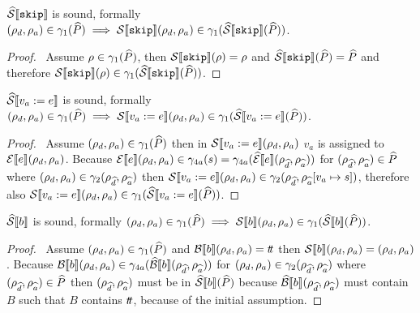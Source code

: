 \begin{conjecture}\label{thm:sound-skip}
    $\widehat{\mathcal{S}} \llbracket \texttt{skip} \rrbracket$ is sound, formally $(\rho_d, \rho_a) \in \gamma_1(\widehat{P}) \implies \mathcal{S} \llbracket \texttt{skip} \rrbracket(\rho_d, \rho_a) \in \gamma_1(\widehat{\mathcal{S}} \llbracket \texttt{skip} \rrbracket(\widehat{P}))$.
\end{conjecture}
\begin{proof}
    \pf\ Assume $\rho \in \gamma_1(\widehat{P})$, then $\mathcal{S} \llbracket \texttt{skip} \rrbracket(\rho) = \rho$ and $\widehat{\mathcal{S}} \llbracket \texttt{skip} \rrbracket(\widehat{P}) = \widehat{P}$ and therefore $\mathcal{S} \llbracket \texttt{skip} \rrbracket(\rho) \in \gamma_1(\widehat{\mathcal{S}} \llbracket \texttt{skip} \rrbracket(\widehat{P}))$.
\end{proof}

\begin{conjecture}\label{thm:sound-assign}
    $\widehat{\mathcal{S}} \llbracket v_a := e \rrbracket$ is sound, formally $(\rho_d, \rho_a) \in \gamma_1(\widehat{P}) \implies \mathcal{S} \llbracket v_a := e \rrbracket(\rho_d, \rho_a) \in \gamma_1(\widehat{\mathcal{S}} \llbracket v_a := e \rrbracket(\widehat{P}))$.
\end{conjecture}
\begin{proof}
    \pf\
    Assume $(\rho_{d}, \rho_{a}) \in \gamma_1(\widehat{P})$ then in $\mathcal{S} \llbracket v_a := e \rrbracket(\rho_{d}, \rho_{a})$ $v_a$ is assigned to $\mathcal{E}\llbracket e \rrbracket(\rho_{d}, \rho_{a})$. Because $\mathcal{E}\llbracket e \rrbracket(\rho_{d}, \rho_{a}) \in \gamma_{4a}(s) = \gamma_{4a}(\widehat{\mathcal{E}}\llbracket e \rrbracket(\rho_{\widehat{d}}, \rho_{\widehat{a}}))$ for $(\rho_{\widehat{d}}, \rho_{\widehat{a}}) \in \widehat{P}$ where $(\rho_{d}, \rho_{a}) \in \gamma_2(\rho_{\widehat{d}}, \rho_{\widehat{a}})$ then $\mathcal{S} \llbracket v_a := e \rrbracket(\rho_{d}, \rho_{a}) \in \gamma_2(\rho_{\widehat{d}}, \rho_{\widehat{a}}[v_a \mapsto s])$, therefore also $\mathcal{S} \llbracket v_a := e \rrbracket(\rho_{d}, \rho_{a})\in \gamma_1(\widehat{\mathcal{S}} \llbracket v_a := e \rrbracket(\widehat{P}))$.
\end{proof}

\begin{conjecture}\label{thm:sound-boolsem}
    $\widehat{\mathcal{S}} \llbracket b \rrbracket$ is sound, formally $(\rho_d, \rho_a) \in \gamma_1(\widehat{P}) \implies \mathcal{S} \llbracket b \rrbracket(\rho_d, \rho_a) \in \gamma_1(\widehat{\mathcal{S}} \llbracket b \rrbracket(\widehat{P}))$.
\end{conjecture}
\begin{proof}
    \pf\
    Assume $(\rho_{d}, \rho_{a}) \in \gamma_1(\widehat{P})$ and $\mathcal{B}\llbracket b \rrbracket(\rho_{d}, \rho_{a}) = t\!t$ then $\mathcal{S} \llbracket b \rrbracket(\rho_{d}, \rho_{a}) = (\rho_{d}, \rho_{a})$.
    Because $\mathcal{B}\llbracket b \rrbracket(\rho_{d}, \rho_{a}) \in \gamma_{4a}(\widehat{\mathcal{B}}\llbracket b \rrbracket(\rho_{\widehat{d}}, \rho_{\widehat{a}}))$ for $(\rho_{d}, \rho_{a}) \in \gamma_2(\rho_{\widehat{d}}, \rho_{\widehat{a}})$ where $(\rho_{\widehat{d}}, \rho_{\widehat{a}}) \in \widehat{P}$ then $(\rho_{\widehat{d}}, \rho_{\widehat{a}})$ must be in $\widehat{\mathcal{S}} \llbracket b \rrbracket(\widehat{P})$ because $\widehat{\mathcal{B}}\llbracket b \rrbracket(\rho_{\widehat{d}}, \rho_{\widehat{a}})$ must contain $B$ such that $B$ contains $t\!t$, because of the initial assumption.
\end{proof}

